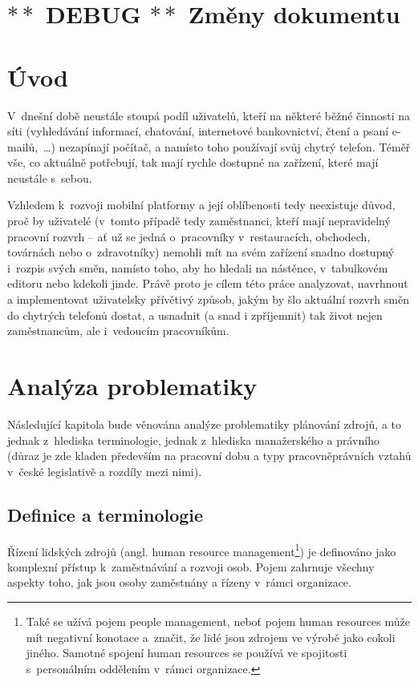 \documentclass[twoside]{ctuthesis}
\begin{document}
\maketitle

\chapter{$\ast\ast$ DEBUG $\ast\ast$ Změny dokumentu}


%
\chapter{Úvod}

V~dnešní době neustále stoupá podíl uživatelů, kteří na některé běžné činnosti na síti (vyhledávání informací, chatování, internetové bankovnictví, čtení a psaní e-mailů,~\ldots) nezapínají počítač, a namísto toho používají svůj chytrý telefon. Téměř vše, co aktuálně potřebují, tak mají rychle dostupné na zařízení, které mají neustále s~sebou.

Vzhledem k~rozvoji mobilní platformy a její oblíbenosti tedy neexistuje důvod, proč by uživatelé (v~tomto případě tedy zaměstnanci, kteří mají nepravidelný pracovní rozvrh -- ať už se jedná o~pracovníky v~restauracích, obchodech, továrnách nebo o~zdravotníky) nemohli mít na svém zařízení snadno dostupný i~rozpis svých směn, namísto toho, aby ho hledali na nástěnce, v~tabulkovém editoru nebo kdekoli jinde. Právě proto je cílem této práce analyzovat, navrhnout a im\-ple\-men\-to\-vat uživatelsky přívětivý způsob, jakým by šlo aktuální rozvrh směn do chytrých telefonů dostat, a usnadnit (a snad i zpříjemnit) tak život nejen zaměstnancům, ale i~vedoucím pracovníkům.




\chapter{Analýza problematiky}
Následující kapitola bude věnována analýze problematiky plánování zdrojů, a to jednak z~hlediska terminologie, jednak z~hlediska manažerského a právního (důraz je zde kladen především na pracovní dobu a typy pracovněprávních vztahů v~české legislativě a rozdíly mezi nimi).

\section{Definice a terminologie}

Řízení lidských zdrojů (angl. human resource management\footnote{Také se užívá pojem people management, neboť pojem human resources může mít negativní konotace a~značit, že lidé jsou zdrojem ve výrobě jako cokoli jiného. \cite[s.~1]{armstrong2014} Samotné spojení human resources se používá ve spojitosti s~personálním oddělením v~rámci organizace. }) je definováno jako komplexní přístup k~zaměstnávání a rozvoji osob. Pojem zahrnuje všechny aspekty toho, jak jsou osoby zaměstnány a řízeny v~rámci organizace. \cite[s.~1]{armstrong2014}
\end{document}
